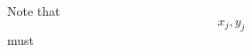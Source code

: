 \documentclass[preview]{standalone}
\begin{document}
\begin{center}
Note that $$x_j, y_j$$ must
\end{center}
\end{document}
